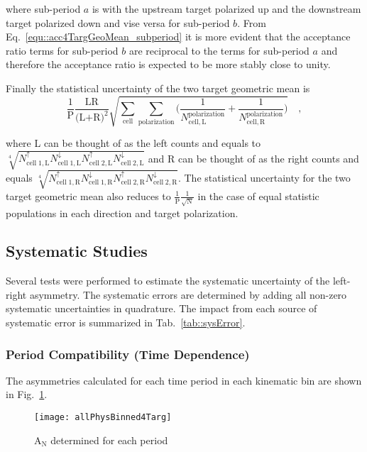 \noindent
where sub-period $a$ is with the upstream target polarized up and the downstream
target polarized down and vise versa for sub-period $b$.  From
Eq.~\ref{equ::acc4TargGeoMean_subperiod} it is more evident that the acceptance
ratio terms for sub-period $b$ are reciprocal to the terms for sub-period $a$
and therefore the acceptance ratio is expected to be more stably close to unity.

Finally the statistical uncertainty of the two target geometric mean is
\begin{equation}
  \frac{1}{\mathrm{P}}
  \frac{\text{LR}}{\Big( \text{L+R} \Big)^2}
  \sqrt{
    \sum_{\mathrm{cell}}\sum_{\mathrm{polarization}}
    \Big(
    \frac{1}{N_{\mathrm{cell,L}}^{\mathrm{polarization}}}
    +
    \frac{1}{N_{\mathrm{cell,R}}^{\mathrm{polarization}}}
    \Big)
  } \quad,
\end{equation}

\noindent
where L can be thought of as the left counts and equals to
$\sqrt[4]{N_{\mathrm{cell\;1,L}}^{\uparrow}N_{\mathrm{cell\;1,
      L}}^{\downarrow}N_{\mathrm{cell\;2,L}}^{\uparrow}N_{\mathrm{cell\;2,
      L}}^{\downarrow}}$ and R can be thought of as the right counts and equals
$\sqrt[4]{N_{\mathrm{cell\;1,R}}^{\uparrow}N_{\mathrm{cell\;1,
      R}}^{\downarrow}N_{\mathrm{cell\;2,R}}^{\uparrow}N_{\mathrm{cell\;2,
      R}}^{\downarrow}}$.  The statistical uncertainty for the two target
geometric mean also reduces to $\frac{1}{\mathrm{P}}\frac{1}{\sqrt{\mathrm{N}}}$
in the case of equal statistic populations in each direction and target
polarization.


\subsection{Systematic Studies} \label{sec::systematics}
Several tests were performed to estimate the systematic uncertainty of the
left-right asymmetry.  The systematic errors are determined by adding all
non-zero systematic uncertainties in quadrature.  The impact from each source of
systematic error is summarized in Tab.~\ref{tab::sysError}.

\subsubsection{Period Compatibility (Time Dependence)}
The asymmetries calculated for each time period in each kinematic bin are shown
in Fig.~\ref{fig::allPhysBinned4Targ}.

\begin{figure}[h!t]
  \begin{center}
    \texttt{[image: allPhysBinned4Targ]}
    \caption{A$_{\mathrm{N}}$ determined for each period}
    \label{fig::allPhysBinned4Targ}
  \end{center}
\end{figure}

